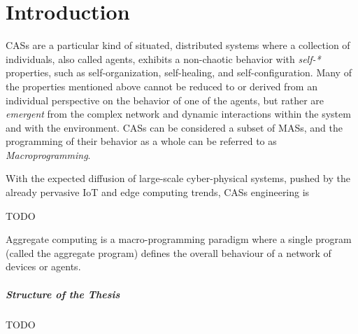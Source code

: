 \chapter{Introduction}
\label{chap:introduction}
\acp{CAS} are a particular kind of situated, distributed systems where a collection of individuals, also called agents, exhibits a non-chaotic behavior with \textit{self-*} properties, such as self-organization, self-healing, and self-configuration\cite{macroprogramming-state-of-the-art}.
%
Many of the properties mentioned above cannot be reduced to or derived from an individual perspective on the behavior of one of the agents, but rather are \textit{emergent} from the complex network and dynamic interactions within the system and with the environment\cite{macroprogramming-state-of-the-art}.
%
\acp{CAS} can be considered a subset of \acp{MAS}, and the programming of their behavior as a whole can be referred to as \textit{Macroprogramming}\cite{macroprogramming-state-of-the-art}.

With the expected diffusion of large-scale cyber-physical systems, pushed by the already pervasive \ac{IoT} and edge computing trends\cite{scafi}, \acp{CAS} engineering is 

TODO

Aggregate computing is a macro-programming paradigm where a single program (called the aggregate program) defines the overall behaviour of a network of devices or agents\cite{macroprogramming-state-of-the-art}.

\paragraph{Structure of the Thesis}

TODO

